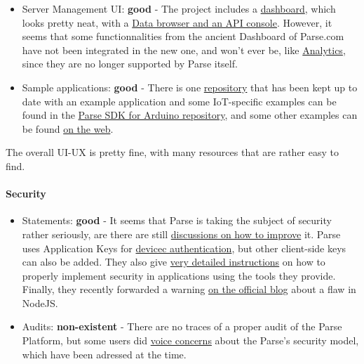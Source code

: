 \documentclass{article}
\begin{document}
\begin{itemize}
\item Server Management UI: \textbf{good} - The project includes a \href{https://github.com/parse-community/parse-dashboardweb}{dashboard}, which looks pretty neat, with a \href{http://blog.parse.com/announcements/introducing-the-parse-server-dashboard/}{Data browser and an API console}. However, it seems that some functionnalities from the ancient Dashboard of Parse.com have not been integrated in the new one, and won't ever be, like \href{http://docs.parseplatform.org/parse-server/guide/#compatibility-with-parsecom}{Analytics}, since they are no longer supported by Parse itself.
\item Sample applications: \textbf{good} - There is one \href{https://github.com/parse-community/parse-server-example}{repository} that has been kept up to date with an example application and some IoT-specific examples can be found in the \href{https://github.com/parse-community/Parse-SDK-Arduino}{Parse SDK for Arduino repository}, and some other examples can be found \href{http://teachmetomake.com/wordpress/arduinocloudparsetutorial}{on the web}.
\end{itemize}

The overall UI-UX is pretty fine, with many resources that are rather easy to find.

\paragraph{Security} 

\begin{itemize}
\item Statements: \textbf{good} - It seems that Parse is taking the subject of security rather seriously, are there are still \href{https://github.com/parse-community/parse-server/issues?utf8=\%E2\%9C\%93&q=is\%3Aissue\%20is\%3Aopen\%20security}{discussions on how to improve} it. Parse uses Application Keys for \href{http://docs.parseplatform.org/parse-server/guide/#using-parse-sdks-with-parse-server}{devicec authentication}, but other client-side keys can also be added. They also give \href{http://docs.parseplatform.org/rest/guide/#security}{very detailed instructions} on how to properly implement security in applications using the tools they provide. Finally, they recently forwarded a warning \href{http://blog.parseplatform.org/security/nodejs/update/notice/2017/07/20/nodejs-security-notice.html}{on the official blog} about a flaw in NodeJS.
\item Audits: \textbf{non-existent} - There are no traces of a proper audit of the Parse Platform, but some users did \href{https://groups.google.com/forum/#!topic/parse-developers/qjvKJYikHQ8}{voice concerns} about the Parse's security model, which have been adressed at the time.
\end{itemize}
\end{document}
